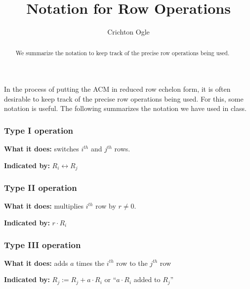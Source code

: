 \documentclass{ximera}
\author{Crichton Ogle}
\title{Notation for Row Operations}
\begin{document}
\begin{abstract}
  We summarize the notation to keep track of the precise row operations being used.
\end{abstract}
\maketitle

In the process of putting the ACM in reduced row echelon form, it is
often desirable to keep track of the precise row operations being
used. For this, some notation is useful. The following summarizes the
notation we have used in class.

\subsubsection*{Type I operation}

\textbf{What it does:} switches $i^{th}$ and $j^{th}$ rows.

\textbf{Indicated by:} $R_i\leftrightarrow R_j$

\subsubsection*{Type II operation}

\textbf{What it does:} multiplies $i^{th}$ row by $r\ne 0$.

\textbf{Indicated by:}  $r\cdot R_i$

\subsubsection*{Type III operation}

\textbf{What it does:} adds $a$ times the $i^{th}$ row to the $j^{th}$ row

\textbf{Indicated by:} $R_j := R_j + a\cdot R_i$ or ``$a\cdot R_i$ added to $R_j$''
\end{document}
